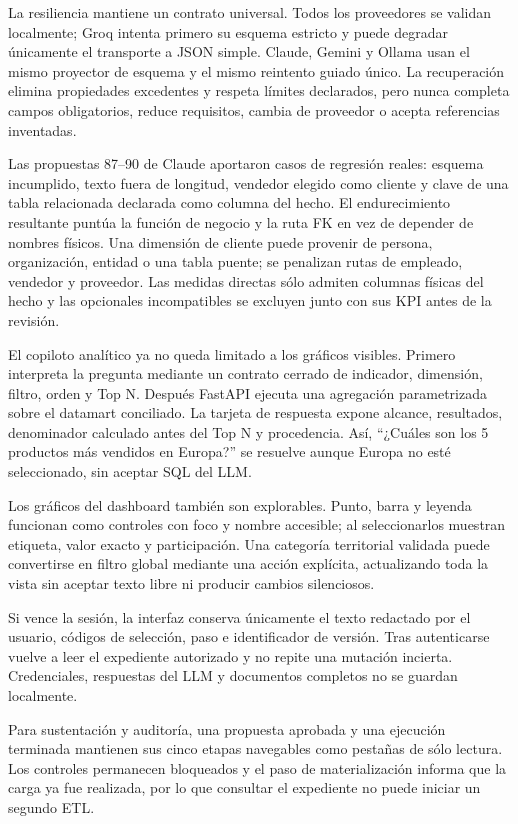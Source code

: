 \documentclass[11pt,letterpaper]{article}
\begin{document}
La resiliencia mantiene un contrato universal. Todos los proveedores se validan localmente; Groq intenta primero su esquema estricto y puede degradar únicamente el transporte a JSON simple. Claude, Gemini y Ollama usan el mismo proyector de esquema y el mismo reintento guiado único. La recuperación elimina propiedades excedentes y respeta límites declarados, pero nunca completa campos obligatorios, reduce requisitos, cambia de proveedor o acepta referencias inventadas.

Las propuestas 87--90 de Claude aportaron casos de regresión reales: esquema incumplido, texto fuera de longitud, vendedor elegido como cliente y clave de una tabla relacionada declarada como columna del hecho. El endurecimiento resultante puntúa la función de negocio y la ruta FK en vez de depender de nombres físicos. Una dimensión de cliente puede provenir de persona, organización, entidad o una tabla puente; se penalizan rutas de empleado, vendedor y proveedor. Las medidas directas sólo admiten columnas físicas del hecho y las opcionales incompatibles se excluyen junto con sus KPI antes de la revisión.

El copiloto analítico ya no queda limitado a los gráficos visibles. Primero interpreta la pregunta mediante un contrato cerrado de indicador, dimensión, filtro, orden y Top N. Después FastAPI ejecuta una agregación parametrizada sobre el datamart conciliado. La tarjeta de respuesta expone alcance, resultados, denominador calculado antes del Top N y procedencia. Así, ``¿Cuáles son los 5 productos más vendidos en Europa?'' se resuelve aunque Europa no esté seleccionado, sin aceptar SQL del LLM.

Los gráficos del dashboard también son explorables. Punto, barra y leyenda funcionan como controles con foco y nombre accesible; al seleccionarlos muestran etiqueta, valor exacto y participación. Una categoría territorial validada puede convertirse en filtro global mediante una acción explícita, actualizando toda la vista sin aceptar texto libre ni producir cambios silenciosos.

Si vence la sesión, la interfaz conserva únicamente el texto redactado por el usuario, códigos de selección, paso e identificador de versión. Tras autenticarse vuelve a leer el expediente autorizado y no repite una mutación incierta. Credenciales, respuestas del LLM y documentos completos no se guardan localmente.

Para sustentación y auditoría, una propuesta aprobada y una ejecución terminada mantienen sus cinco etapas navegables como pestañas de sólo lectura. Los controles permanecen bloqueados y el paso de materialización informa que la carga ya fue realizada, por lo que consultar el expediente no puede iniciar un segundo ETL.
\end{document}
